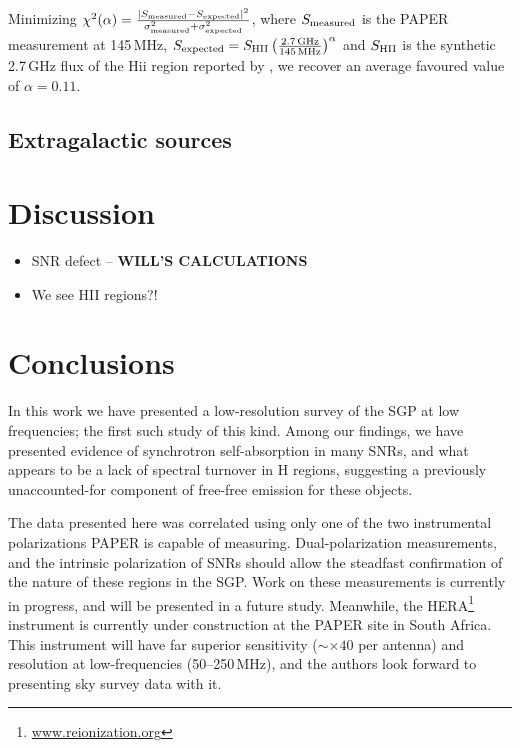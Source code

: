 \documentclass[useAMS,usenatbib]{mn2e}
\begin{document}
Minimizing $\chi^2(\alpha) = \frac{|S_{\rm measured} - S_{\rm expected}|^2}{\sigma_{\rm measured}^2 + \sigma_{\rm expected}^2}$, where $S_{\rm measured}$ is the PAPER measurement at 145\,MHz,  $S_{\rm expected}=S_{\rm HII}\left(\frac{2.7\,{\rm GHz}}{145\,{\rm MHz}}\right)^{\alpha}$ and $S_{\rm HII}$ is the synthetic 2.7\,GHz flux of the H{\sc ii} region reported by \cite{Paladini.03}, we recover an average favoured value of $\alpha=0.11$.

%


\subsection{Extragalactic sources}


\section{Discussion}
\label{sec:disc}

\begin{itemize}
\item SNR defect -- {\bf WILL'S CALCULATIONS}
\item We see HII regions?!
\end{itemize}

\section{Conclusions}
\label{sec:conc}

In this work we have presented a low-resolution survey of the SGP at low frequencies; the first such study of this kind. Among our findings, we have presented evidence of synchrotron self-absorption in many SNRs, and what appears to be a lack of spectral turnover in {H} regions, suggesting a previously unaccounted-for component of free-free emission for these objects.

The data presented here was correlated using only one of the two instrumental polarizations PAPER is capable of measuring. Dual-polarization measurements, and the intrinsic polarization of SNRs \citep[e.g.][]{Gao_v.11} should allow the steadfast confirmation of the nature of these regions in the SGP. Work on these measurements is currently in progress, and will be presented in a future study. Meanwhile, the HERA\footnote{\url{www.reionization.org}} instrument is currently under construction at the PAPER site in South Africa. This instrument will have far superior sensitivity ($\sim\times40$ per antenna) and resolution at low-frequencies (50--250\,MHz), and the authors look forward to presenting sky survey data with it.
\end{document}
